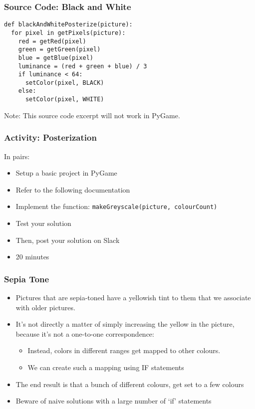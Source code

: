 
\begin{frame}[fragile]
	\frametitle{Source Code: Black and White}
	
\begin{lstlisting}
def blackAndWhitePosterize(picture):
  for pixel in getPixels(picture):
    red = getRed(pixel)
    green = getGreen(pixel)
    blue = getBlue(pixel)
    luminance = (red + green + blue) / 3
    if luminance < 64:
      setColor(pixel, BLACK)
    else:
      setColor(pixel, WHITE)
\end{lstlisting}

Note: This source code excerpt will not work in PyGame.

\end{frame}

\begin{frame}
	\frametitle{Activity: Posterization}
	
	In pairs:
	
	\vspace{2em}
	
	\begin{itemize}		
		\item Setup a basic project in PyGame
		\item Refer to the following documentation
		\item Implement the function: \texttt{makeGreyscale(picture, colourCount)}
		\item Test your solution
		\item Then, post your solution on Slack
		\item 20 minutes
	\end{itemize}
\end{frame}

\begin{frame}
	\frametitle{Sepia Tone}
	
	\begin{itemize}		
		\item Pictures that are sepia-toned have a yellowish tint to them that we associate with older pictures.
		\item It's not directly a matter of simply increasing the yellow in the picture, because it's not a one-to-one correspondence:
		\begin{itemize}
			\item Instead, colors in different ranges get mapped to other colours.
			\item We can create such a mapping using IF statements
		\end{itemize}	
		\item The end result is that a bunch of different colours, get set to a few colours
		\item Beware of naive solutions with a large number of `if' statements
	\end{itemize}
\end{frame}

